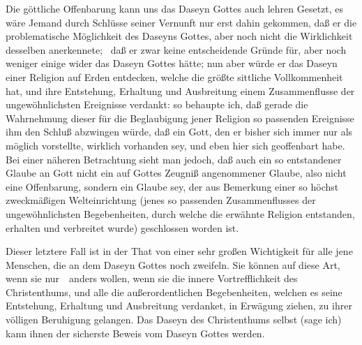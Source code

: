 \begin{aufza}
\begin{aufzb}
\item Die göttliche Offenbarung kann uns das Daseyn Gottes auch lehren  Gesetzt, es wäre Jemand durch Schlüsse seiner Vernunft nur erst dahin gekommen, daß er die problematische Möglichkeit des Daseyns Gottes, aber noch nicht die Wirklichkeit desselben anerkennete; \dh\ daß er zwar keine entscheidende Gründe für, aber noch weniger einige wider das Daseyn Gottes hätte; nun aber würde er das Daseyn einer Religion auf Erden entdecken, welche die größte sittliche Vollkommenheit hat, und ihre Entstehung, Erhaltung und Ausbreitung einem Zusammenflusse der ungewöhnlichsten Ereignisse verdankt: so behaupte ich, daß gerade die Wahrnehmung dieser für die Beglaubigung jener Religion so passenden Ereignisse ihm den Schluß abzwingen würde, daß ein Gott, den er bisher sich immer nur als möglich vorstellte, wirklich vorhanden sey, und eben hier sich geoffenbart habe. Bei einer näheren Betrachtung sieht man jedoch, daß auch ein so entstandener Glaube an Gott nicht ein auf Gottes Zeugniß angenommener Glaube, also nicht eine Offenbarung, sondern ein Glaube sey, der aus Bemerkung einer so höchst zweckmäßigen Welteinrichtung (jenes so passenden Zusammenflusses der ungewöhnlichsten Begebenheiten, durch welche die erwähnte Religion entstanden, erhalten und verbreitet wurde) geschlossen worden ist.

\begin{RWanm}  Dieser letztere Fall ist in der That von einer sehr großen Wichtigkeit für alle jene Menschen, die an dem Daseyn Gottes noch zweifeln. Sie können auf diese Art, wenn sie nur~\ anders wollen, wenn sie die innere Vortrefflichkeit des Christenthums, und alle die außerordentlichen Begebenheiten, welchen es seine Entstehung, Erhaltung und Ausbreitung verdanket, in Erwägung ziehen, zu ihrer völligen Beruhigung gelangen. Das Daseyn des Christenthums selbst (sage ich) kann ihnen der sicherste Beweis vom Daseyn Gottes werden.\end{RWanm}
\end{aufzb}
\end{aufza}

